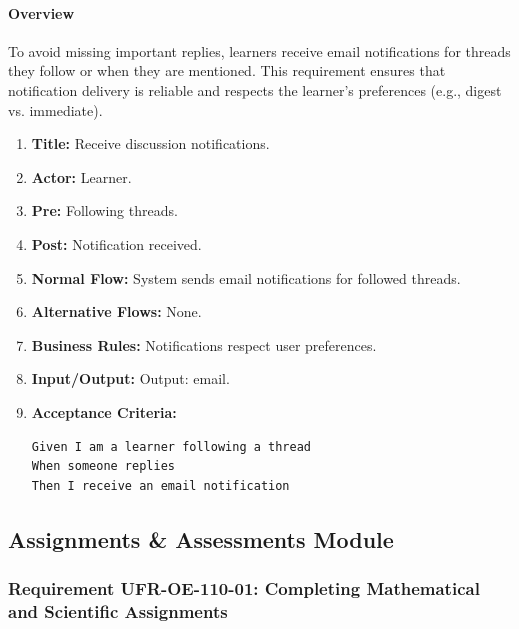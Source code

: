 \paragraph{Overview}
To avoid missing important replies, learners receive email notifications for threads they follow or when they are mentioned. This requirement ensures that notification delivery is reliable and respects the learner’s preferences (e.g., digest vs. immediate).
\begin{enumerate}[label=\textbf{\arabic*.}]
\item \textbf{Title:} Receive discussion notifications.
\item \textbf{Actor:} Learner.
\item \textbf{Pre:} Following threads.
\item \textbf{Post:} Notification received.
\item \textbf{Normal Flow:} System sends email notifications for followed threads.
\item \textbf{Alternative Flows:} None.
\item \textbf{Business Rules:} Notifications respect user preferences.
\item \textbf{Input/Output:} Output: email.
\item \textbf{Acceptance Criteria:}
    \begin{verbatim}
Given I am a learner following a thread
When someone replies
Then I receive an email notification
    \end{verbatim}
\end{enumerate}

\subsection{Assignments \& Assessments Module}
\subsubsection{Requirement UFR-OE-110-01: Completing Mathematical and Scientific Assignments}
